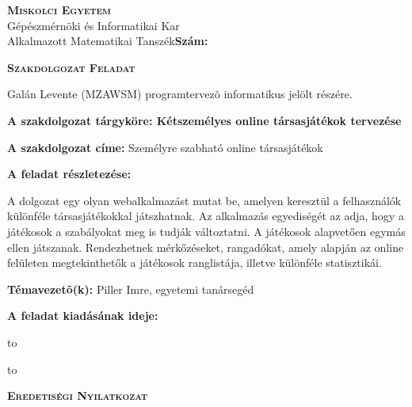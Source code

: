 \begin{flushleft}
	\textsc{\bfseries Miskolci Egyetem}\\
	Gépészmérnöki és Informatikai Kar\\
	Alkalmazott Matematikai Tanszék\hspace*{4cm}\hfil \textbf{Szám:}
\end{flushleft}
\vskip 0.5cm
\begin{center}
	\large\textsc{\bfseries Szakdolgozat Feladat}
\end{center}
\vskip 0.5cm
Galán Levente (MZAWSM) programtervezõ informatikus jelölt részére.\newline

\noindent\textbf{A szakdolgozat tárgyköre: Kétszemélyes online társasjátékok tervezése} \newline

\noindent\textbf{A szakdolgozat címe:} Személyre szabható online társasjátékok

\noindent\textbf{A feladat részletezése:}

\noindent A dolgozat egy olyan webalkalmazást mutat be, amelyen keresztül a felhasználók különféle társasjátékokkal játszhatnak.
\noindent Az alkalmazás egyediségét az adja, hogy a játékosok a szabályokat meg is tudják változtatni.
\noindent A játékosok alapvetően egymás ellen játszanak.
\noindent Rendezhetnek mérkőzéseket, rangadókat, amely alapján az online felületen megtekinthetők a játékosok ranglistája, illetve különféle statisztikái.

\vfill

\noindent\textbf{Témavezetõ(k):} Piller Imre, egyetemi tanársegéd\newline

\noindent\textbf{A feladat kiadásának ideje:}\newline


\vskip 2cm

\hbox to 

\hbox to 


\newpage

\vspace*{1cm}  
\begin{center}
\large\textsc{\bfseries Eredetiségi Nyilatkozat}
\end{center}
\vspace*{2cm}

